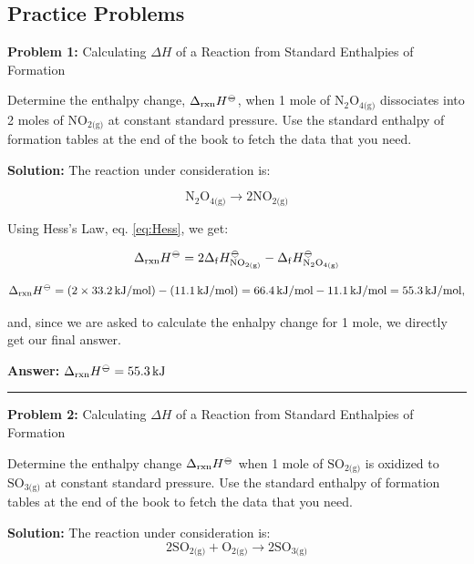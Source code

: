 \documentclass[
  9pt,
]{extbook}
\theoremstyle{definition}
\theoremstyle{definition}
\theoremstyle{definition}
\theoremstyle{definition}
\theoremstyle{remark}
\begin{document}
\subsection{Practice Problems}\label{exer4}

\textbf{Problem 1:} Calculating \(\Delta H\) of a Reaction from Standard Enthalpies of Formation

Determine the enthalpy change, \(\Delta_{\text{rxn}} H^{-\kern-6pt{\ominus}\kern-6pt-}\), when 1 mole of \(\text{N}_2 \text{O}_{4\text{(g)}}\) dissociates into 2 moles of \(\text{NO}_{2\text{(g)}}\) at constant standard pressure. Use the standard enthalpy of formation tables at the end of the book to fetch the data that you need.

\textbf{Solution:} The reaction under consideration is:

\[\text{N}_2 \text{O}_{4\text{(g)}} \rightarrow 2 \text{NO}_{2\text{(g)}}\]

Using Hess's Law, eq. \eqref{eq:Hess}, we get:

\[\Delta_{\text{rxn}} H^{-\kern-6pt{\ominus}\kern-6pt-}= 2 \Delta_{\mathrm{f}} H_{\text{NO}_{2\text{(g)}}}^{-\kern-6pt{\ominus}\kern-6pt-}-\Delta_{\mathrm{f}} H_{\text{N}_2 \text{O}_{4\text{(g)}}}^{-\kern-6pt{\ominus}\kern-6pt-}\]

\[\Delta_{\text{rxn}} H^{-\kern-6pt{\ominus}\kern-6pt-}= (2 \times 33.2 \, \text{kJ/mol}) - (11.1 \, \text{kJ/mol}) = 66.4 \, \text{kJ/mol} - 11.1 \, \text{kJ/mol} = 55.3 \, \text{kJ/mol},\]

and, since we are asked to calculate the enhalpy change for 1 mole, we directly get our final answer.

\textbf{Answer:} \(\Delta_{\text{rxn}} H^{-\kern-6pt{\ominus}\kern-6pt-}= 55.3 \, \text{kJ}\)

\begin{center}\rule{0.5\linewidth}{0.5pt}\end{center}

\textbf{Problem 2:} Calculating \(\Delta H\) of a Reaction from Standard Enthalpies of Formation

Determine the enthalpy change \(\Delta_{\text{rxn}} H^{-\kern-6pt{\ominus}\kern-6pt-}\) when 1 mole of \(\text{SO}_{2\text{(g)}}\) is oxidized to \(\text{SO}_{3\text{(g)}}\) at constant standard pressure. Use the standard enthalpy of formation tables at the end of the book to fetch the data that you need.

\textbf{Solution:} The reaction under consideration is:
\[2\text{SO}_{2\text{(g)}}+ \text{O}_{2\text{(g)}} \rightarrow 2 \text{SO}_{3\text{(g)}}\]
\end{document}
